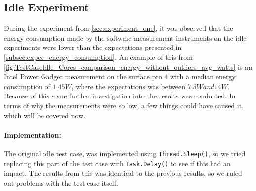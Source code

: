 \subsection{Idle Experiment}

During the experiment from \cref{sec:experiment_one}, it was observed that the energy consumption made by the software measurement instruments on the idle experiments were lower than the expectations presented in \cref{subsec:expec_energy_consumption}. An example of this from \cref*{fig:TestCaseIdle_Cores_comparison_energy_without_outliers_avg_watts} is an Intel Power Gadget measurement on the surface pro 4 with a median energy consumption of $1.45W$, where the expectations was between $7.5W and 14W$. Because of this some further investigation into the results was conducted. In terms of why the measurements were so low, a few things could have caused it, which will be covered now.



\paragraph{Implementation:} The original idle test case, was implemented using \texttt{Thread.Sleep()}, so we tried replacing this part of the test case with \texttt{Task.Delay()} to see if this had an impact. The results from this was identical to the previous results, so we ruled out problems with the test case itself.

